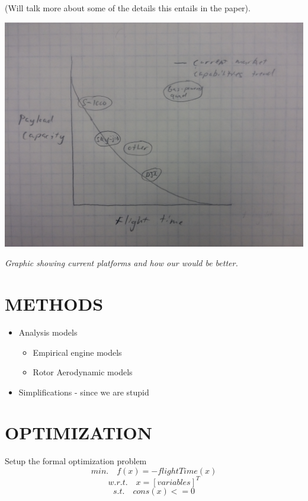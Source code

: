 \documentclass[letterpaper, 10 pt, conference]{ieeeconf}  %
\makeatletter
\newenvironment{figurehere}
  {\def\@captype{figure}}
  {}
\newcommand{\of}[1]{\ensuremath{\left(#1\right)}}
\makeatother
\begin{document}
(Will talk more about some of the details this entails in the paper).

\begin{figurehere}
	\begin{center}
		\includegraphics[width=.40\textwidth]{current_capabilities.jpg}
		\caption{\textit{Graphic showing current platforms and how our would be better.}}
		\label{current_cap}
	\end{center}
\end{figurehere}




	
\section{METHODS}

\begin{itemize}
	\item{Analysis models}
	\begin{itemize}
		\item{Empirical engine models}
		\item{Rotor Aerodynamic models}
	\end{itemize}
	\item{Simplifications - since we are stupid}
\end{itemize}

\section{OPTIMIZATION}
Setup the formal optimization problem
\begin{equation}
min. \quad f\of{x} = -flightTime\of{x}
\label{eq:objective}
\end{equation}
\begin{equation}
w.r.t. \quad x = [variables]^T
\label{eq:vars}
\end{equation}
\begin{equation}
s.t. \quad cons\of{x} <= 0 
\label{eq:constrants}
\end{equation}
\end{document}
